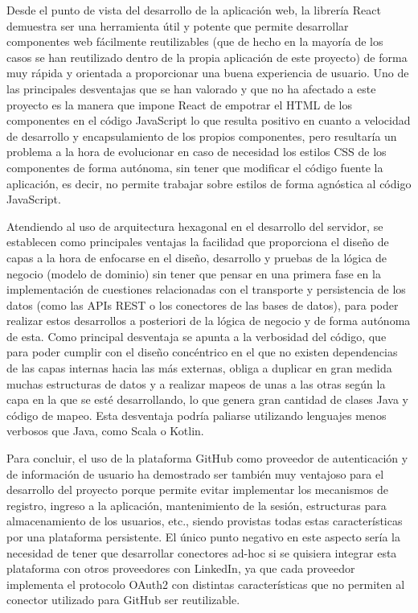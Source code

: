 \documentclass[a4paper, 12pt]{book}
\begin{document}
    Desde el punto de vista del desarrollo de la aplicación web, la librería React demuestra ser una herramienta útil y potente
    que permite desarrollar componentes web fácilmente reutilizables
    (que de hecho en la mayoría de los casos se han reutilizado dentro de la propia aplicación de este proyecto)
    de forma muy rápida y orientada a proporcionar una buena experiencia de usuario. Uno de las principales desventajas que se han
    valorado y que no ha afectado a este proyecto es la manera que impone React de empotrar el HTML de los componentes en el código JavaScript
    lo que resulta positivo en cuanto a velocidad de desarrollo y encapsulamiento de los propios componentes, pero resultaría un problema a la hora
    de evolucionar en caso de necesidad los estilos CSS de los componentes de forma autónoma, sin tener que modificar el código fuente la aplicación,
    es decir, no permite trabajar sobre estilos de forma agnóstica al código JavaScript.

    Atendiendo al uso de arquitectura hexagonal en el desarrollo del servidor, se establecen como principales ventajas la facilidad que
    proporciona el diseño de capas a la hora de enfocarse en el diseño, desarrollo y pruebas de la lógica de negocio (modelo de dominio)
    sin tener que pensar en una primera fase en la implementación de cuestiones relacionadas con el transporte y persistencia de los datos
    (como las APIs REST o los conectores de las bases de datos), para poder realizar estos desarrollos a posteriori de la lógica de negocio
    y de forma autónoma de esta. Como principal desventaja se apunta a la verbosidad del código, que para poder cumplir con el diseño concéntrico
    en el que no existen dependencias de las capas internas hacia las más externas, obliga a duplicar en gran medida muchas estructuras de datos
    y a realizar mapeos de unas a las otras según la capa en la que se esté desarrollando, lo que genera gran cantidad de clases Java y código
    de mapeo. Esta desventaja podría paliarse utilizando lenguajes menos verbosos que Java, como Scala o Kotlin.

    Para concluir, el uso de la plataforma GitHub como proveedor de autenticación y de información de usuario ha demostrado ser también
    muy ventajoso para el desarrollo del proyecto porque permite evitar implementar los mecanismos de registro, ingreso a la aplicación,
    mantenimiento de la sesión, estructuras para almacenamiento de los usuarios, etc., siendo provistas todas estas características por una
    plataforma persistente. El único punto negativo en este aspecto sería la necesidad de tener que desarrollar conectores ad-hoc si se quisiera
    integrar esta plataforma con otros proveedores con LinkedIn, ya que cada proveedor implementa el protocolo OAuth2 con distintas características
    que no permiten al conector utilizado para GitHub ser reutilizable.
\end{document}
